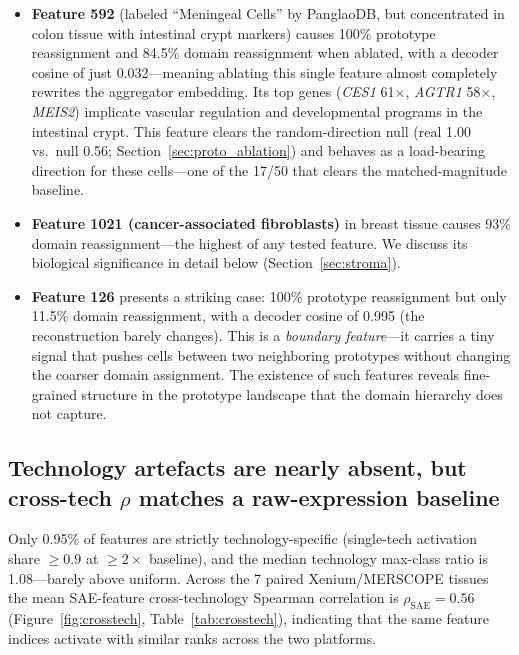 \documentclass[11pt]{article}
\begin{document}
\begin{itemize}
\item \textbf{Feature 592} (labeled ``Meningeal Cells'' by PanglaoDB,
      but concentrated in colon tissue with intestinal crypt markers)
      causes 100\% prototype reassignment and 84.5\% domain reassignment
      when ablated, with a decoder cosine of just 0.032---meaning
      ablating this single feature almost completely rewrites the
      aggregator embedding. Its top genes (\emph{CES1} 61$\times$,
      \emph{AGTR1} 58$\times$, \emph{MEIS2}) implicate vascular
      regulation and developmental programs in the intestinal crypt.
      This feature clears the random-direction null (real 1.00 vs.\
      null 0.56; Section~\ref{sec:proto_ablation}) and
      behaves as a load-bearing direction for these cells---one of
      the 17/50 that clears the matched-magnitude baseline.

\item \textbf{Feature 1021 (cancer-associated fibroblasts)} in breast
      tissue causes 93\% domain reassignment---the highest of any tested
      feature. We discuss its biological significance in detail below
      (Section~\ref{sec:stroma}).

\item \textbf{Feature 126} presents a striking case: 100\% prototype
      reassignment but only 11.5\% domain reassignment, with a
      decoder cosine of 0.995 (the reconstruction barely changes).
      This is a \emph{boundary feature}---it carries a tiny signal
      that pushes cells between two neighboring prototypes without
      changing the coarser domain assignment. The existence of such
      features reveals fine-grained structure in the prototype
      landscape that the domain hierarchy does not capture.
\end{itemize}

\subsection{Technology artefacts are nearly absent, but cross-tech $\rho$ matches a raw-expression baseline}
\label{sec:crosstech}

Only 0.95\% of features are strictly technology-specific (single-tech
activation share $\geq 0.9$ at $\geq 2\times$ baseline), and the
median technology max-class ratio is 1.08---barely above uniform.
Across the 7 paired Xenium/MERSCOPE tissues the mean SAE-feature
cross-technology Spearman correlation is $\rho_\text{SAE} = 0.56$
(Figure~\ref{fig:crosstech}, Table~\ref{tab:crosstech}), indicating
that the same feature indices activate with similar ranks across the
two platforms.
\end{document}
